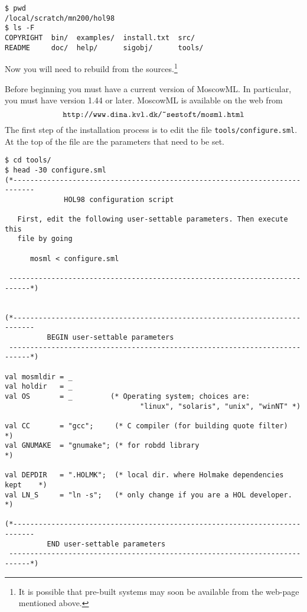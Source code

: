 \setcounter{sessioncount}{1}
\begin{session}
\begin{verbatim}
$ pwd
/local/scratch/mn200/hol98
$ ls -F
COPYRIGHT  bin/  examples/  install.txt  src/
README     doc/  help/      sigobj/      tools/
\end{verbatim}
\end{session}

Now you will need to rebuild \HOL{} from the sources.\footnote{It is
  possible that pre-built systems may soon be available from the
  web-page mentioned above.}

Before beginning you must have a current version of MoscowML.  In
particular, you must have version 1.44 or later.  MoscowML is
available on the web from
\[
\texttt{http://www.dina.kvl.dk/\~{}sestoft/mosml.html}
\]
The first step of the installation process is to edit the file
\texttt{tools/configure.sml}.  At the top of the file are the
parameters that need to be set.

\begin{session}
\begin{verbatim}
$ cd tools/
$ head -30 configure.sml
(*---------------------------------------------------------------------------
              HOL98 configuration script

   First, edit the following user-settable parameters. Then execute this
   file by going

      mosml < configure.sml

 ---------------------------------------------------------------------------*)


(*---------------------------------------------------------------------------
          BEGIN user-settable parameters
 ---------------------------------------------------------------------------*)

val mosmldir = _
val holdir   = _
val OS       = _         (* Operating system; choices are:
                                "linux", "solaris", "unix", "winNT" *)

val CC       = "gcc";     (* C compiler (for building quote filter)        *)
val GNUMAKE  = "gnumake"; (* for robdd library                             *)

val DEPDIR   = ".HOLMK";  (* local dir. where Holmake dependencies kept    *)
val LN_S     = "ln -s";   (* only change if you are a HOL developer.       *)

(*---------------------------------------------------------------------------
          END user-settable parameters
 ---------------------------------------------------------------------------*)
\end{verbatim}
\end{session}


